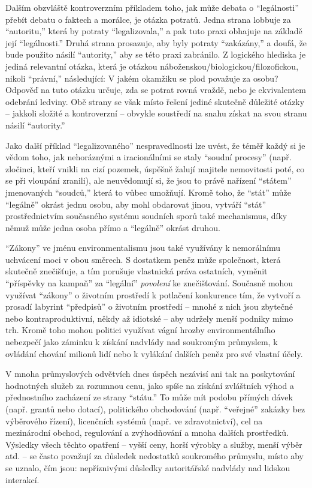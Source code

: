 \documentclass{book}
\begin{document}
Dalším obzvláště kontroverzním příkladem toho, jak může debata o \enquote{legálnosti} přebít debatu o faktech a morálce, je otázka potratů. Jedna strana lobbuje za \enquote{autoritu,} která by potraty \enquote{legalizovala,} a pak tuto praxi obhajuje na základě její \enquote{legálnosti.} Druhá strana prosazuje, aby byly potraty \enquote{zakázány,} a doufá, že bude použito násilí \enquote{autority,} aby se této praxi zabránilo. Z logického hlediska je jediná relevantní otázka, která je otázkou náboženskou/biologickou/filozofickou, nikoli \enquote{právní,} následující: V jakém okamžiku se plod považuje za osobu? Odpověď na tuto otázku určuje, zda se potrat rovná vraždě, nebo je ekvivalentem odebrání ledviny. Obě strany se však místo řešení jediné skutečně důležité otázky -- jakkoli složité a kontroverzní -- obvykle soustředí na snahu získat na svou stranu násilí \enquote{autority.}

Jako další příklad \enquote{legalizovaného} nespravedlnosti lze uvést, že téměř každý si je vědom toho, jak nehoráznými a iracionálními se staly \enquote{soudní procesy} (např. zločinci, kteří vnikli na cizí pozemek, úspěšně žalují majitele nemovitosti poté, co se při vloupání zranili), ale neuvědomují si, že jsou to právě nařízení \enquote{státem} jmenovaných \enquote{soudců,} která to vůbec umožňují. Kromě toho, že \enquote{stát} může \enquote{legálně} okrást jednu osobu, aby mohl obdarovat jinou, vytváří \enquote{stát} prostřednictvím současného systému soudních sporů také mechanismus, díky němuž může jedna osoba přímo a \enquote{legálně} okrást druhou.

\enquote{Zákony} ve jménu environmentalismu jsou také využívány k nemorálnímu uchvácení moci v obou směrech. S dostatkem peněz může společnost, která skutečně znečišťuje, a tím porušuje vlastnická práva ostatních, vyměnit \enquote{příspěvky na kampaň} za \enquote{legální} \emph{povolení} ke znečišťování. Současně mohou využívat \enquote{zákony} o životním prostředí k potlačení konkurence tím, že vytvoří a prosadí labyrint \enquote{předpisů} o životním prostředí -- mnohé z nich jsou zbytečné nebo kontraproduktivní, někdy až idiotské -- aby udržely menší podniky mimo trh. Kromě toho mohou politici využívat vágní hrozby environmentálního nebezpečí jako záminku k získání nadvlády nad soukromým průmyslem, k ovládání chování milionů lidí nebo k vylákání dalších peněz pro své vlastní účely.

V mnoha průmyslových odvětvích dnes úspěch nezávisí ani tak na poskytování hodnotných služeb za rozumnou cenu, jako spíše na získání zvláštních výhod a přednostního zacházení ze strany \enquote{státu.} To může mít podobu přímých dávek (např. grantů nebo dotací), politického obchodování (např. \enquote{veřejné} zakázky bez výběrového řízení), licenčních systémů (např. ve zdravotnictví), cel na mezinárodní obchod, regulování a zvýhodňování a mnoha dalších prostředků. Výsledky všech těchto opatření -- vyšší ceny, horší výrobky a služby, menší výběr atd. -- se často považují za důsledek nedostatků soukromého průmyslu, místo aby se uznalo, čím jsou: nepříznivými důsledky autoritářské nadvlády nad lidskou interakcí.
\end{document}

